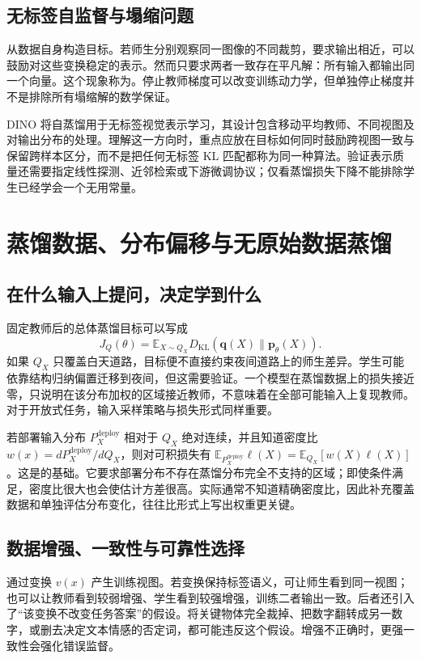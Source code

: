 \documentclass[UTF8,12pt,a4paper,fontset=fandol]{ctexart}
\begin{document}
\subsection{无标签自监督与塌缩问题}
从数据自身构造目标。若师生分别观察同一图像的不同裁剪，要求输出相近，可以鼓励对这些变换稳定的表示。然而只要求两者一致存在平凡解：所有输入都输出同一个向量。这个现象称为。停止教师梯度可以改变训练动力学，但单独停止梯度并不是排除所有塌缩解的数学保证。

DINO 将自蒸馏用于无标签视觉表示学习\cite{caron2021}，其设计包含移动平均教师、不同视图及对输出分布的处理。理解这一方向时，重点应放在目标如何同时鼓励跨视图一致与保留跨样本区分，而不是把任何无标签 KL 匹配都称为同一种算法。验证表示质量还需要指定线性探测、近邻检索或下游微调协议；仅看蒸馏损失下降不能排除学生已经学会一个无用常量。

\section{蒸馏数据、分布偏移与无原始数据蒸馏}
\label{sec:kd-data}

\subsection{在什么输入上提问，决定学到什么}
固定教师后的总体蒸馏目标可以写成
\begin{equation}
 J_Q(\theta)=\mathbb E_{X\sim Q_X}
 D_{\mathrm{KL}}(\mathbf q(X)\|\mathbf p_\theta(X)).
 \label{eq:kd-input-distribution}
\end{equation}
如果 $Q_X$ 只覆盖白天道路，目标便不直接约束夜间道路上的师生差异。学生可能依靠结构归纳偏置迁移到夜间，但这需要验证。一个模型在蒸馏数据上的损失接近零，只说明在该分布加权的区域接近教师，不意味着在全部可能输入上复现教师。对于开放式任务，输入采样策略与损失形式同样重要。

若部署输入分布 $P_X^{\mathrm{deploy}}$ 相对于 $Q_X$ 绝对连续，并且知道密度比 $w(x)=dP_X^{\mathrm{deploy}}/dQ_X$，则对可积损失有 $\mathbb E_{P_X^{\mathrm{deploy}}}\ell(X)=\mathbb E_{Q_X}[w(X)\ell(X)]$。这是的基础。它要求部署分布不存在蒸馏分布完全不支持的区域；即使条件满足，密度比很大也会使估计方差很高。实际通常不知道精确密度比，因此补充覆盖数据和单独评估分布变化，往往比形式上写出权重更关键。

\subsection{数据增强、一致性与可靠性选择}
通过变换 $v(x)$ 产生训练视图。若变换保持标签语义，可让师生看到同一视图；也可以让教师看到较弱增强、学生看到较强增强，训练二者输出一致。后者还引入了“该变换不改变任务答案”的假设。将关键物体完全裁掉、把数字翻转成另一数字，或删去决定文本情感的否定词，都可能违反这个假设。增强不正确时，更强一致性会强化错误监督。
\end{document}
